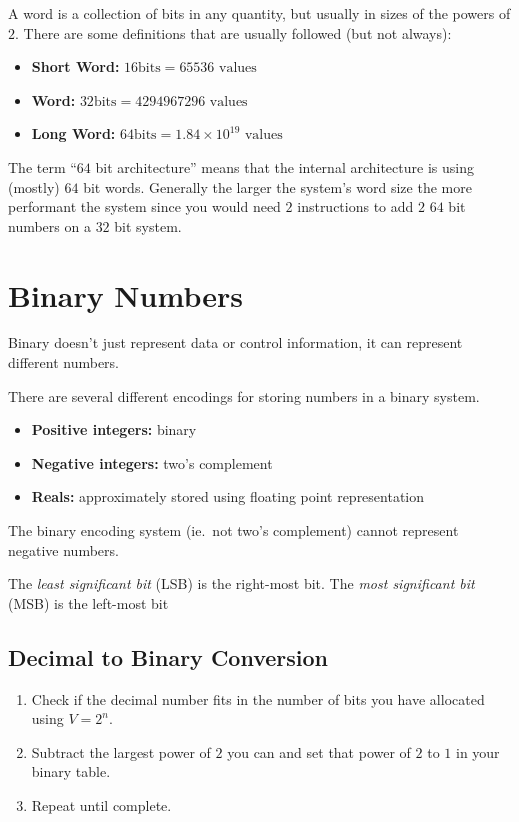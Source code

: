 A word is a collection of bits in any quantity, but usually in sizes of the powers of \(2\).
There are some definitions that are usually followed (but not always):

\begin{itemize}
    \item \textbf{Short Word:} \(16 \textrm{bits} = 65536 \textrm{ values}\)
    \item \textbf{Word:} \(32 \textrm{bits} = 4294967296 \textrm{ values}\)
    \item \textbf{Long Word:} \(64 \textrm{bits} = 1.84 \times 10^{19} \textrm{ values}\)
\end{itemize}
The term ``\(64\) bit architecture'' means that the internal architecture is using (mostly) \(64\) bit words.
Generally the larger the system's word size the more performant the system since you would need \(2\) instructions to add \(2\) \(64\) bit numbers on a \(32\) bit system.

\section{Binary Numbers}\label{sec:binary_numbers}

Binary doesn't just represent data or control information, it can represent different numbers.

There are several different encodings for storing numbers in a binary system.
\begin{itemize}
    \item \textbf{Positive integers:} binary
    \item \textbf{Negative integers:} two's complement
    \item \textbf{Reals:} approximately stored using floating point representation
\end{itemize}

\begin{note}
    The binary encoding system (ie.\ not two's complement) cannot represent negative numbers.
\end{note}
The \emph{least significant bit} (LSB) is the right-most bit.
The \emph{most significant bit} (MSB) is the left-most bit

\subsection{Decimal to Binary Conversion}\label{sub:decimal_to_binary_conversion}

\begin{enumerate}
    \item Check if the decimal number fits in the number of bits you have allocated using \(V=2^n\).
    \item Subtract the largest power of \(2\) you can and set that power of \(2\) to \(1\) in your binary table.
    \item Repeat until complete.
\end{enumerate}

